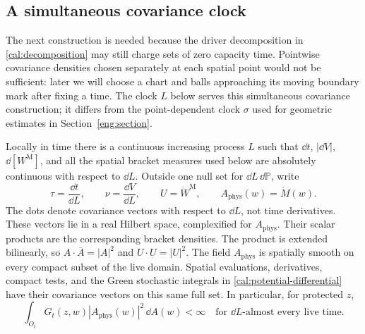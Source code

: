 \subsection{A simultaneous covariance clock}
\label{cal:clock-subsection}

The next construction is needed because the driver decomposition in
\eqref{cal:decomposition} may still charge sets of zero capacity time.
Pointwise covariance densities chosen separately at each spatial point
would not be sufficient: later we will choose a chart and balls
approaching its moving boundary mark after fixing a time. The clock $L$
below serves this simultaneous covariance construction; it differs from
the point-dependent clock $\sigma$ used for geometric estimates in
Section~\ref{eng:section}.

\begin{lemma}
\label{cal:covariance}
Locally in time there is a continuous increasing process $L$ such that
$\dd t$, $|\dd V|$, $\dd[W^{\mathrm M}]$, and all the spatial bracket measures
used below are absolutely continuous with respect to $\dd L$.  Outside one null set for $\dd L\,\dd\mathbb P$, write
\begin{equation}
 \tau=\frac{\dd t}{\dd L},\qquad
 \nu=\frac{\dd V}{\dd L},\qquad
 U=\dot W^{\mathrm M},\qquad A_{\mathrm{phys}}(w)=\dot M(w).
 \label{cal:clock-notation}
\end{equation}
The dots denote covariance vectors with respect to $\dd L$, not time
derivatives. These vectors lie in a real Hilbert space, complexified
for $A_{\mathrm{phys}}$.  Their scalar products are the corresponding
bracket densities.  The product is extended bilinearly, so
$A\cdot\overline A=|A|^2$ and $U\cdot U=|U|^2$.
The field $A_{\mathrm{phys}}$ is spatially smooth on every compact
subset of the live domain.  Spatial evaluations, derivatives, compact
tests, and the Green stochastic integrals in
\eqref{cal:potential-differential} have their covariance vectors on this
same full set.  In particular, for protected $z$,
\begin{equation}
 \int_{O_t}G_t(z,w)|A_{\mathrm{phys}}(w)|^2\,\dd A(w)<\infty
 \quad\text{for }\dd L\text{-almost every live time.}
 \label{cal:clock-green-integrability}
\end{equation}
\end{lemma}

